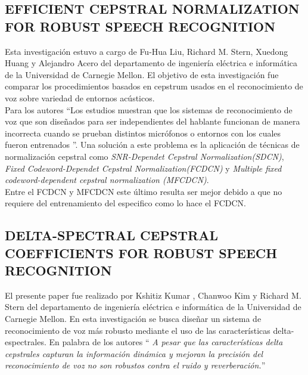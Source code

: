 \subsection{EFFICIENT CEPSTRAL NORMALIZATION FOR ROBUST SPEECH RECOGNITION}
Esta investigación estuvo a cargo de Fu-Hua Liu, Richard M. Stern, Xuedong Huang y Alejandro Acero del departamento de ingeniería eléctrica e informática de la Universidad de Carnegie Mellon. El objetivo de esta investigación fue comparar los procedimientos basados en cepstrum usados en el reconocimiento de voz sobre variedad de entornos acústicos.\\ Para los autores \textquotedblleft Los estudios muestran que los sistemas de reconocimiento de voz que son diseñados para ser independientes del hablante funcionan de manera incorrecta cuando se prueban distintos micrófonos o entornos con los cuales fueron entrenados \textquotedblright. Una solución a este problema es la aplicación de técnicas de normalización cepstral como \textit{ SNR-Dependet Cepstral Normalization(SDCN)}, \textit{Fixed Codeword-Dependet Cepstral Normalization(FCDCN)} y \textit{ Multiple fixed codeword-dependent cepstral normalization (MFCDCN)}.\\ Entre el FCDCN y MFCDCN este último resulta ser mejor debido a que no requiere del entrenamiento del especifico como lo hace el FCDCN.

\subsection{DELTA-SPECTRAL CEPSTRAL COEFFICIENTS FOR ROBUST SPEECH RECOGNITION}

El presente paper fue realizado por Kshitiz Kumar  , Chanwoo Kim y Richard M. Stern del departamento de ingeniería eléctrica e informática de la Universidad de Carnegie Mellon. En esta investigación se busca diseñar un sistema de reconocimiento de voz más robusto mediante el uso de las características delta-espectrales. En palabra de los autores \textquotedblleft \textit{ A pesar que las características delta cepstrales capturan la información dinámica y mejoran la precisión del reconocimiento de voz no son robustos contra el ruido y reverberación.}\textquotedblright

